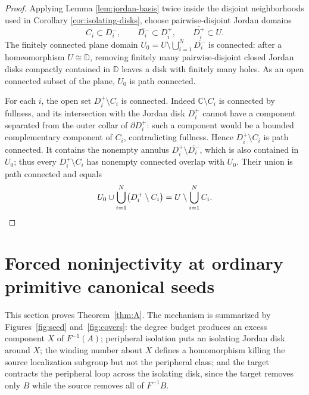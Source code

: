 \documentclass[11pt,reqno]{amsart}
\theoremstyle{definition}
\theoremstyle{remark}
\begin{document}
\begin{proof}
Applying Lemma \ref{lem:jordan-basis} twice inside the disjoint neighborhoods used in Corollary \ref{cor:isolating-disks}, choose pairwise-disjoint Jordan domains
\[
 C_i\subset D_i^-,\qquad \overline{D_i^-}\subset D_i^+,\qquad \overline{D_i^+}\subset U.
\]
The finitely connected plane domain \(U_0=U\setminus\bigcup_{i=1}^N\overline{D_i^-}\) is connected: after a homeomorphism \(U\cong\mathbb D\), removing finitely many pairwise-disjoint closed Jordan disks compactly contained in \(\mathbb D\) leaves a disk with finitely many holes.  As an open connected subset of the plane, \(U_0\) is path connected.

For each \(i\), the open set \(D_i^+\setminus C_i\) is connected.  Indeed \(\mathbb C\setminus C_i\) is connected by fullness, and its intersection with the Jordan disk \(D_i^+\) cannot have a component separated from the outer collar of \(\partial D_i^+\): such a component would be a bounded complementary component of \(C_i\), contradicting fullness.  Hence \(D_i^+\setminus C_i\) is path connected.  It contains the nonempty annulus \(D_i^+\setminus\overline{D_i^-}\), which is also contained in \(U_0\); thus every \(D_i^+\setminus C_i\) has nonempty connected overlap with \(U_0\).  Their union is path connected and equals
\[
 U_0\cup\bigcup_{i=1}^N\bigl(D_i^+\setminus C_i\bigr)=U\setminus\bigcup_{i=1}^N C_i. \qedhere
\]
\end{proof}

\section{Forced noninjectivity at ordinary primitive canonical seeds}
\label{sec:forced}




This section proves Theorem~\ref{thm:A}.  The mechanism is summarized
by Figures~\ref{fig:seed} and~\ref{fig:covers}: the degree budget
produces an excess component $X$ of $F^{-1}(A)$; peripheral isolation
puts an isolating Jordan disk around $X$; the winding number about $X$
defines a homomorphism killing the source localization subgroup but not
the peripheral class; and the target contracts the peripheral loop
across the isolating disk, since the target removes only $B$ while the
source removes all of $F^{-1}B$.


\end{document}
